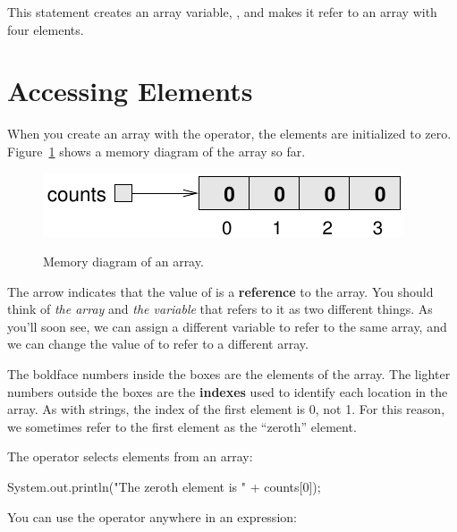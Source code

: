 This statement creates an array variable, , and makes it refer to an array with four elements.


\section{Accessing Elements}
\label{elements}

When you create an array with the  operator, the elements are initialized to zero.
Figure~\ref{fig.array} shows a memory diagram of the  array so far.

\begin{figure}[!ht]
\begin{center}
\includegraphics[alt={Memory diagram showing an int array with four elements initialized to zero, with indexes 0-3 and a reference arrow pointing to the array}]{figs/array.pdf}
\caption{Memory diagram of an  array.}
\label{fig.array}
\end{center}
\end{figure}


The arrow indicates that the value of  is a {\bf reference} to the array.
You should think of {\em the array} and {\em the variable} that refers to it as two different things.
As you'll soon see, we can assign a different variable to refer to the same array, and we can change the value of  to refer to a different array.


The boldface numbers inside the boxes are the elements of the array.
The lighter numbers outside the boxes are the {\bf indexes} used to identify each location in the array.
As with strings, the index of the first element is 0, not 1.
For this reason, we sometimes refer to the first element as the ``zeroth'' element.

The \java{[]} operator selects elements from an array:

\begin{code}
System.out.println("The zeroth element is " + counts[0]);
\end{code}

You can use the \java{[]} operator anywhere in an expression:

